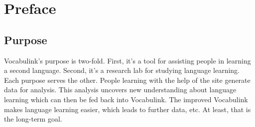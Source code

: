 \chapter{Preface}

\section{Purpose}

Vocabulink's purpose is two-fold. First, it's a tool for assisting people in
learning a second language. Second, it's a research lab for studying language
learning. Each purpose serves the other. People learning with the help of the
site generate data for analysis. This analysis uncovers new understanding about
language learning which can then be fed back into Vocabulink. The improved
Vocabulink makes language learning easier, which leads to further data, etc. At
least, that is the long-term goal.
